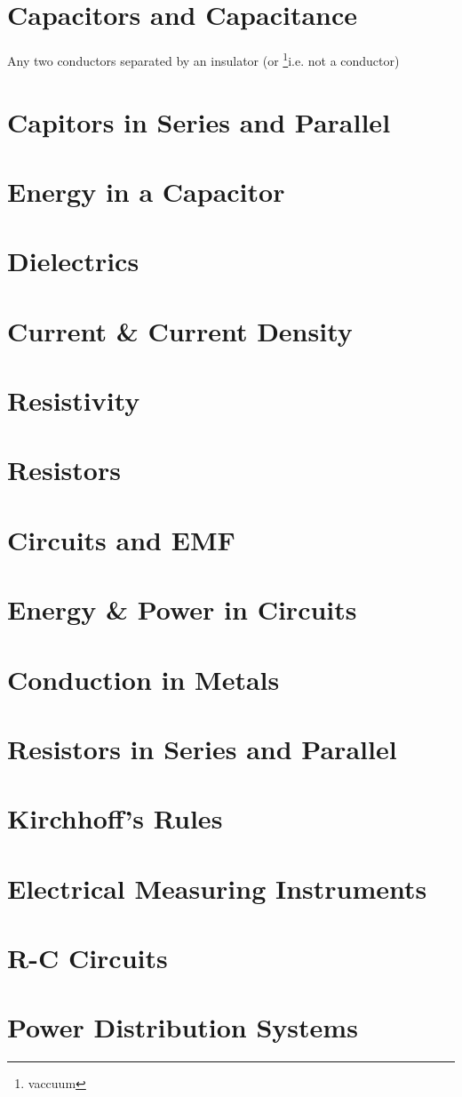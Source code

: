 \documentclass[10pt, a4paper, twocolumn]{article}
\begin{document}
    \section{Capacitors and Capacitance}	
    Any two conductors separated by an insulator (or \footnote{vaccuum}{i.e. not a conductor})
    \section{Capitors in Series and Parallel}	
    \section{Energy in a Capacitor}	
    \section{Dielectrics}	
    \section{Current \& Current Density}	
    \section{Resistivity}	
    \section{Resistors}	
    \section{Circuits and EMF}	
    \section{Energy \& Power in Circuits}	
    \section{Conduction in Metals}	
    \section{Resistors in Series and Parallel}
    \section{Kirchhoff's Rules}
    \section{Electrical Measuring Instruments}
    \section{R-C Circuits}
    \section{Power Distribution Systems}
\end{document}
